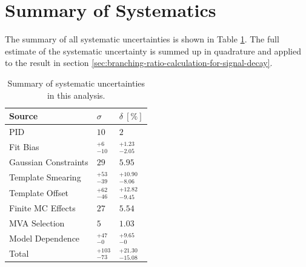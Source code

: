 \section{Summary of Systematics}

The summary of all systematic uncertainties is shown in Table \ref{tab:sys_summary}. The full estimate of the systematic uncertainty is summed up in quadrature and applied to the result in section \ref{sec:branching-ratio-calculation-for-signal-decay}.


\begin{table}[!htb]
	\centering
	\begin{tabular}{|l|l|l|}
		\hline
		Source & $\sigma$ & $\delta~[\%]$ \\
		\hline
		\hline
		PID & $10$ & $2$ \\
		\hline
		Fit Bias & $ {}^{+6}_{-10}$ & ${}^{+1.23}_{-2.05}$ \\
		\hline
		Gaussian Constraints & $29$ & $5.95$ \\
		\hline
		Template Smearing & ${}^{+53}_{-39}$ & ${}^{+10.90}_{-8.06}$ \\
		\hline
		Template Offset & ${}^{+62}_{-46}$ & ${}^{+12.82}_{-9.45}$ \\
		\hline
		Finite MC Effects & $27$ & $5.54$ \\
		\hline
		MVA Selection & $5$ & $1.03$\\
		\hline
		Model Dependence & ${}^{+47}_{-0}$ & ${}^{+9.65}_{-0}$ \\
		\hline
		\hline
		Total & ${} ^{+103}_{-73}$ & ${}^{+21.30}_{-15.08}$ \\
		\hline
	\end{tabular}
	\caption{Summary of systematic uncertainties in this analysis.}
	\label{tab:sys_summary}
\end{table}







